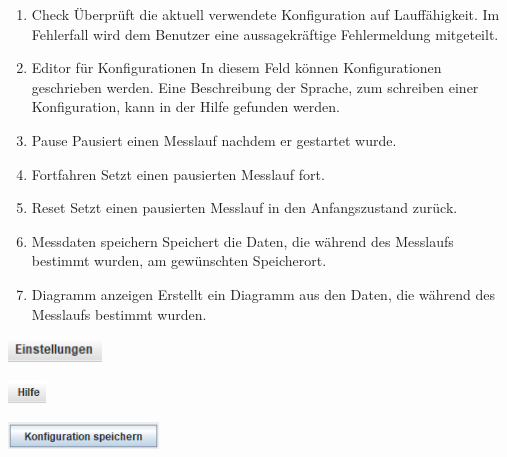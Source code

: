 \documentclass[parskip=full]{scrartcl}
\begin{document}
\begin{enumerate}
    \item Check
    Überprüft die aktuell verwendete Konfiguration auf Lauffähigkeit. Im Fehlerfall wird dem Benutzer eine aussagekräftige Fehlermeldung mitgeteilt.
    
    \item Editor für Konfigurationen
    In diesem Feld können Konfigurationen geschrieben werden. Eine Beschreibung der Sprache, zum schreiben einer Konfiguration, kann in der Hilfe gefunden werden.
    
    \item Pause
    Pausiert einen Messlauf nachdem er gestartet wurde.
    
    \item Fortfahren
    Setzt einen pausierten Messlauf fort.
    
    \item Reset
    Setzt einen pausierten Messlauf in den Anfangszustand zurück.
    
    \item Messdaten speichern
    Speichert die Daten, die während des Messlaufs bestimmt wurden, am gewünschten Speicherort.
    
    \item Diagramm anzeigen
    Erstellt ein Diagramm aus den Daten, die während des Messlaufs bestimmt wurden.
    
\end{enumerate}



\begin{flushleft}
    \includegraphics[width = 2.5cm]{Grafiken/2-Einstellungen.png}
\end{flushleft}

\begin{flushleft}
    \includegraphics[width = 1cm]{Grafiken/3-Hilfe.png}
\end{flushleft}

\begin{flushleft}
    \includegraphics[width = 4cm]{Grafiken/4-Konfiguration_speichern.png}
\end{flushleft}
\end{document}
